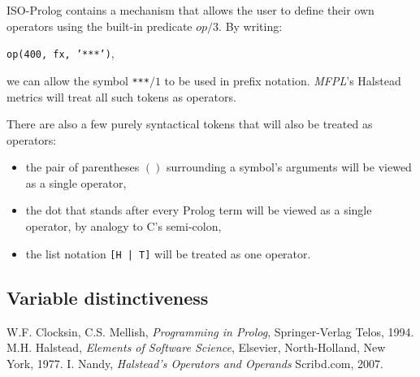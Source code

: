 \documentclass[11pt,a4paper,twoside]{article}
\newcommand{\pname}{\emph{MFPL}}
\begin{document}
\begin{multicols}{2}
ISO-Prolog contains a mechanism that allows the user to define their
own operators using the built-in predicate $op/3$. By writing: 
\begin{center}
\texttt{op(400, fx, '***')},
\end{center}
 we can allow the symbol \texttt{***}$/1$ to be used in prefix
notation. \pname's Halstead metrics will treat all such tokens as
operators.

There are also a few purely syntactical tokens that will also be
treated as operators:
\begin{itemize}
\item the pair of parentheses $()$ surrounding a symbol's arguments
  will be viewed as a single operator,
\item the dot that stands after every Prolog term will be viewed as a
  single operator, by analogy to C's semi-colon,
\item the list notation \texttt{[H | T]} will be treated as one
  operator.
\end{itemize}

\subsection{Variable distinctiveness}



\end{multicols}

\newpage

\begin{thebibliography}{halstead}
  W.F. Clocksin, C.S. Mellish, 
  \emph{Programming in Prolog}, 
  Springer-Verlag Telos, 1994.
  M.H. Halstead, 
  \emph{Elements of Software Science}, 
  Elsevier, North-Holland, New York, 1977.
  I. Nandy, 
  \emph{Halstead's Operators and Operands}
  Scribd.com, 2007.
\end{thebibliography}
\end{document}
